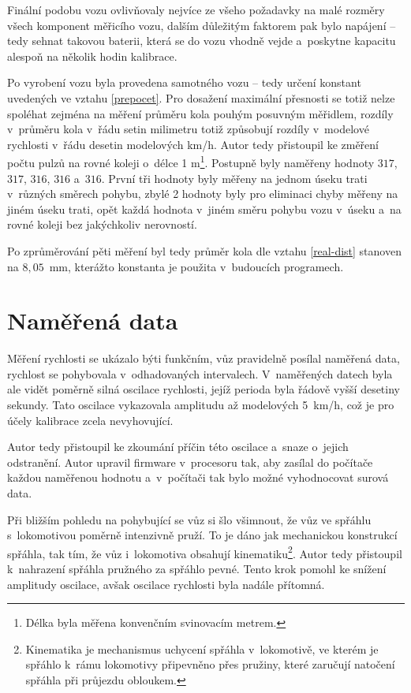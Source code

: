 Finální podobu vozu ovlivňovaly nejvíce ze všeho požadavky na malé rozměry všech
komponent měřicího vozu, dalším důležitým faktorem pak bylo napájení -- tedy
sehnat takovou baterii, která se do vozu vhodně vejde a~poskytne kapacitu
alespoň na několik hodin kalibrace.

Po vyrobení vozu byla provedena  samotného vozu -- tedy určení
konstant uvedených ve vztahu \ref{prepocet}. Pro dosažení maximální přesnosti
se totiž nelze spoléhat zejména na měření průměru kola pouhým posuvným
měřidlem, rozdíly v~průměru kola v~řádu setin milimetru totiž způsobují rozdíly
v~modelové rychlosti v~řádu desetin modelových km/h. Autor tedy přistoupil ke
změření počtu pulzů na rovné koleji o~délce 1 m\footnote{Délka byla měřena
konvenčním svinovacím metrem.}. Postupně byly naměřeny hodnoty $317$, $317$,
$316$, $316$ a~$316$. První tři hodnoty byly měřeny na jednom úseku trati
v~různých směrech pohybu, zbylé 2 hodnoty byly pro eliminaci chyby měřeny na
jiném úseku trati, opět každá hodnota v~jiném směru pohybu vozu v~úseku a~na
rovné koleji bez jakýchkoliv nerovností.

Po zprůměrování pěti měření byl tedy průměr kola dle vztahu \ref{real-dist}
stanoven na $8,05$~mm, kterážto konstanta je použita v~budoucích programech.

\section{Naměřená data}
\label{sec:wsm-data}

Měření rychlosti se ukázalo býti funkčním, vůz pravidelně posílal naměřená
data, rychlost se pohybovala v~odhadovaných intervalech. V~naměřených datech
byla ale vidět poměrně silná oscilace rychlosti, jejíž perioda byla řádově
vyšší desetiny sekundy. Tato oscilace vykazovala amplitudu až
modelových 5~km/h, což je pro účely kalibrace zcela nevyhovující.

Autor tedy přistoupil ke zkoumání příčin této oscilace a~snaze o~jejich
odstranění. Autor upravil firmware v~procesoru tak, aby zasílal do počítače
každou naměřenou hodnotu a~v~počítači tak bylo možné vyhodnocovat surová data.

Při bližším pohledu na pohybující se vůz si šlo všimnout, že vůz ve spřáhlu
s~lokomotivou poměrně intenzivně pruží. To je dáno jak mechanickou konstrukcí
spřáhla, tak tím, že vůz i~lokomotiva obsahují kinematiku\footnote{Kinematika
je mechanismus uchycení spřáhla v~lokomotivě, ve kterém je spřáhlo k~rámu
lokomotivy připevněno přes pružiny, které zaručují natočení spřáhla při
průjezdu obloukem.}.
Autor tedy přistoupil k~nahrazení spřáhla pružného za spřáhlo pevné. Tento krok
pomohl ke snížení amplitudy oscilace, avšak oscilace rychlosti byla nadále
přítomná.

